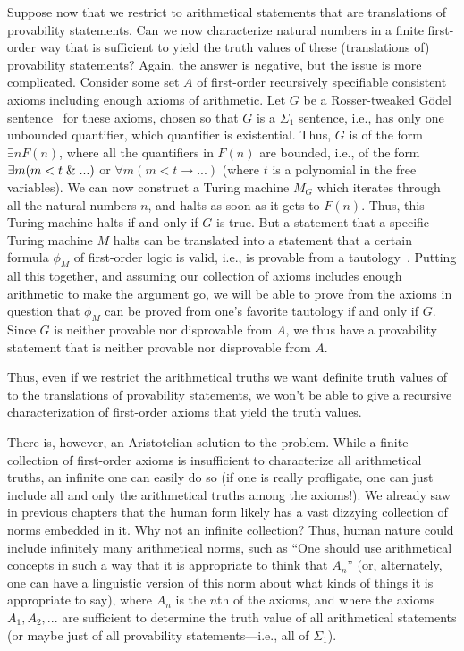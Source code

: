 Suppose now that we restrict  to arithmetical statements that are translations of provability statements.
Can we now characterize natural numbers in a finite first-order way that is sufficient to yield the truth values of these 
(translations of) provability statements? Again, the answer is negative, but the issue is more complicated. Consider some 
set $A$ of first-order recursively specifiable consistent axioms including enough axioms of arithmetic. Let $G$ be a Rosser-tweaked
G\"odel sentence~\parencite[44]{Batzoglou} for these axioms, chosen so that $G$ is a $\Sigma_1$ sentence, i.e., has only one unbounded quantifier, 
which quantifier is existential. Thus, $G$ is of the form $\exists n F(n)$, where all the quantifiers in $F(n)$ are 
bounded, i.e., of the form $\exists m (m<t \mathrel{\&} ...)$ or $\forall m(m<t \rightarrow ...)$ (where $t$ is a polynomial
in the free variables). We can now construct a Turing
machine $M_G$ which iterates through all the natural numbers $n$, and halts as soon as it gets to $F(n)$. Thus, this Turing machine
halts if and only if $G$ is true. But a statement that a specific Turing machine $M$ halts can be translated into a statement
that a certain formula $\phi_M$ of first-order logic is valid, i.e., is provable from a tautology~. Putting all this together,
and assuming our collection of axioms includes enough arithmetic to make the argument go, we will be able to prove from the 
axioms in question that $\phi_M$ can be proved from one's favorite tautology if and only if $G$. Since $G$ is neither 
provable nor disprovable from $A$, we thus have a provability statement that is neither provable nor disprovable
from $A$.

Thus, even if we restrict the arithmetical truths we want definite truth values of to the translations of provability
statements, we won't be able to give a recursive characterization of first-order axioms that yield the truth values.

There is, however, an Aristotelian solution to the problem. While a finite collection of first-order axioms is insufficient 
to characterize all arithmetical truths, an infinite one can easily do so (if one is really profligate, one can just include all and only the arithmetical truths among the axioms!). We already saw in previous chapters that the human form likely has a vast
dizzying collection of norms embedded in it. Why not an infinite collection? Thus, human nature could include infinitely many arithmetical norms, such as ``One should use arithmetical concepts in such a way that it is appropriate to think that $A_n$'' (or, alternately, one can have a linguistic version of this norm about what kinds of things it is appropriate to say), where $A_n$ is the $n$th of the axioms, and where the axioms $A_1,A_2,...$ are sufficient to determine the truth value of all arithmetical statements (or maybe just of all 
provability statements---i.e., all of $\Sigma_1$).

